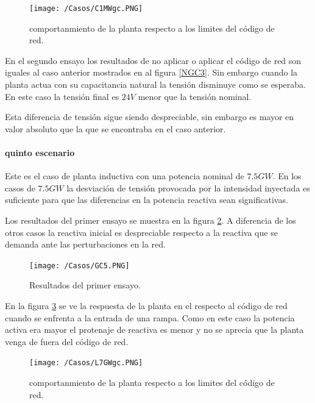 \documentclass{book}
\begin{document}
\begin{figure}[h!]
\centering
\texttt{[image: /Casos/C1MWgc.PNG]}
\caption{comportanmiento de la planta respecto a los limites del c\'odigo de red. }
\label{C1MWgc}
\end{figure} \par

En el segundo ensayo los resultados de no aplicar o aplicar el c\'odigo de red son iguales al caso anterior mostrados en al figura \ref{NGC3}. Sin embargo cuando la planta actua con su capacitancia natural la tensi\'on disminuye como se esperaba. En este caso la tensi\'on final es $24V$ menor que la tensi\'on nominal. \par

Esta diferencia de tensi\'on sigue siendo despreciable, sin embargo es mayor en valor absoluto que la que se encontraba en el caso anterior. \par 

	\paragraph{quinto escenario}

Este es el caso de planta inductiva con una potencia nominal de $7.5GW$. En los casos de $7.5GW$ la desviaci\'on de tensi\'on provocada por la intensidad inyectada es suficiente para que las diferencias en la potencia reactiva sean significativas. \par

Los resultados del primer ensayo se muestra en la figura \ref{GC5}. A diferencia de los otros casos la reactiva inicial es despreciable respecto a la reactiva que se demanda ante las perturbaciones en la red. \par

\begin{figure}[h!]
\centering
\texttt{[image: /Casos/GC5.PNG]}
\caption{Resultados del primer ensayo. }
\label{GC5}
\end{figure} \par

En la figura \ref{L7GWgc} se ve la respuesta de la planta en el respecto al c\'odigo de red cuando se enfrenta a la entrada de una rampa. Como en este caso la potencia activa era mayor el protenaje de reactiva es menor y no se aprecia que la planta venga de fuera del c\'odigo de red. \par
 
\begin{figure}[h!]
\centering
\texttt{[image: /Casos/L7GWgc.PNG]}
\caption{comportanmiento de la planta respecto a los limites del c\'odigo de red. }
\label{L7GWgc}
\end{figure} \par
\end{document}
